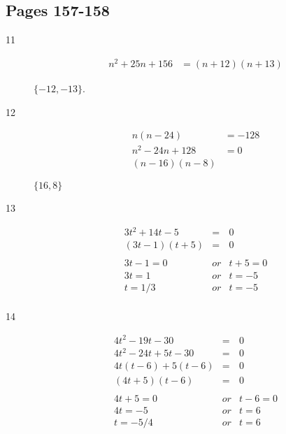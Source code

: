 \documentclass[fleqn,addpoints]{exam}
\begin{document}
\subsection{Pages 157-158}

\begin{description}






\item[11]
\begin{align*}
  n^2 + 25n + 156 &= (n + 12)(n + 13)
\end{align*}

$\{-12, -13\}$.

\item[12]
\begin{align*}
  n(n - 24) &= -128 \\
  n^2 - 24n + 128 &= 0 \\
  (n - 16)(n - 8)
\end{align*}

$\{16, 8\}$

\item[13]
\begin{eqnarray*}
  3t^2 + 14t - 5 &= & 0 \\
  (3t - 1)(t + 5) &=& 0 \\
  \\
  3t - 1 = 0 &or& t + 5 = 0 \\
  3t = 1 &or& t = -5 \\
  t = 1/3 &or& t = -5 \\
\end{eqnarray*}

\item[14]
\begin{eqnarray*}
  4t^2 - 19t - 30 &=& 0 \\
  4t^2 - 24t + 5t - 30 &=& 0 \\
  4t(t - 6) + 5(t - 6) &=& 0 \\
  (4t + 5)(t - 6) &=& 0 \\
  \\
  4t + 5 = 0 &or& t - 6 = 0 \\
  4t = -5 &or& t = 6 \\
  t = -5/4 &or& t = 6 \\
\end{eqnarray*}


\end{description}
\end{document}
